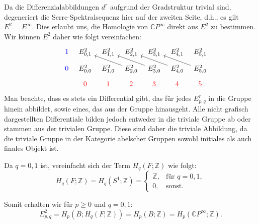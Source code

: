 \documentclass[12pt]{article}
\numberwithin{conj}{section}
\begin{document}
    Da die Differenzialabbildungen $d^{r}$ aufgrund der Gradstruktur trivial sind,
    degeneriert die Serre-Spektralsequenz hier auf der zweiten Seite, d.h., es gilt
    $E^{2} = E^{\infty}$. Dies erlaubt uns, die Homologie von $\mathbb{C}P^{\infty}$
    direkt aus $E^{2}$ zu bestimmen. Wir können $E^{2}$ daher wie folgt vereinfachen:
    \[
        \begin{tikzcd}
            [sep=tiny] {\color{blue}} & {\color{blue}1} & {E^2_{0,1}} & {E^2_{1,1}} &
            {E^2_{2,1}} & {E^2_{3,1}} & {E^2_{4,1}} & {E^2_{5,1}} \\ & {\color{blue}0}
            & {E^2_{0,0}} & {E^2_{1,0}} & {E^2_{2,0}} & {E^2_{3,0}} & {E^2_{4,0}} & {E^2_{5,0}}
            \\ & {\color{red}} & {\color{red}0} & {\color{red}1} & {\color{red}2} & {\color{red}3}
            & {\color{red}4} & {\color{red}5} \arrow[from=2-5, to=1-3] \arrow[from=2-6,
            to=1-4] \arrow[from=2-7, to=1-5] \arrow[from=2-8, to=1-6]
        \end{tikzcd}
    \]
    Man beachte, dass es stets ein Differential gibt, das für jedes $E^{r}_{p,q}$
    in die Gruppe hinein abbildet, sowie eines, das aus der Gruppe hinausgeht. Alle
    nicht grafisch dargestellten Differentiale bilden jedoch entweder in die triviale
    Gruppe ab oder stammen aus der trivialen Gruppe. Diese sind daher die triviale
    Abbildung, da die triviale Gruppe in der Kategorie abelscher Gruppen sowohl initiales
    als auch finales Objekt ist.

    Da $q = 0,1$ ist, vereinfacht sich der Term $H_{q}(F;\mathbb{Z})$ wie folgt:
    \[
        H_{q}(F;\mathbb{Z}) = H_{q}(S^{1};\mathbb{Z}) =
        \begin{cases}
            \mathbb{Z}, & \text{für } q = 0,1, \\
            0,          & \text{sonst}.
        \end{cases}
    \]

    Somit erhalten wir für $p \geq 0$ und $q = 0,1$:
    \[
        E^{2}_{p,q}= H_{p}(B; H_{q}(F;\mathbb{Z}))  = H_{p}(B;\mathbb{Z}) = H_{p}(\mathbb{C}P^{\infty};\mathbb{Z}).
    \]
\end{document}
